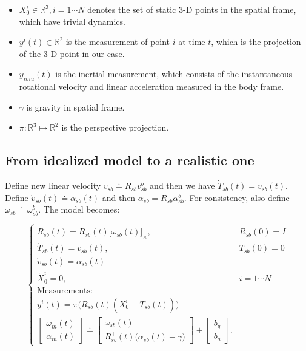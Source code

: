 \documentclass[letter,10pt]{article}
\newcommand{\real}{\mathbb{R}}
\newcommand{\asym}[1]{{\lbrack #1\rbrack}_\times{}}
\begin{document}
\begin{itemize}
\item
$X_0^i \in \real^3, i=1\cdots N$ denotes the set of static 3-D points in the spatial frame, which have trivial dynamics.

\item
$y^i(t) \in \real^2$ is the measurement of point $i$ at time $t$, which is the projection of the 3-D point in our case.

\item
$y_{imu}(t)$ is the inertial measurement, which consists of the instantaneous rotational velocity and linear acceleration measured in the body frame.

\item
$\gamma$ is gravity in spatial frame.

\item
$\pi: \real^3 \mapsto \real^2$ is the perspective projection.

\end{itemize}

\subsection{From idealized model to a realistic one}
Define new linear velocity $v_{sb}\doteq R_{sb}v_{sb}^b$ and then we have $\dot{T}_{sb}(t)=v_{sb}(t)$. Define $\dot{v}_{sb}(t)\doteq \alpha_{sb}(t)$ and then $\alpha_{sb}=R_{sb}\alpha_{sb}^b$. For consistency, also define $\omega_{sb}\doteq \omega_{sb}^b$. The model becomes:

\begin{equation*}
\begin{cases}
\dot{R}_{sb}(t)=R_{sb}(t)\asym{\omega_{sb}(t)}, &R_{sb}(0)=I\\
\dot{T}_{sb}(t)=v_{sb}(t), &T_{sb}(0)=0\\
\dot{v}_{sb}(t)=\alpha_{sb}(t)\\
\dot{X}_0^i=0, &i=1\cdots N\\
\text{Measurements:}\\
y^i(t)=\pi\big(R_{sb}^\top(t)(X_0^i-T_{sb}(t))\big)\\
\begin{bmatrix}
 \omega_m(t)\\
 \alpha_m(t)
\end{bmatrix}
\doteq
\begin{bmatrix}
	    \omega_{sb}(t)\\
	    R_{sb}^\top(t) \big(\alpha_{sb}(t)-\gamma \big)
           \end{bmatrix}
+           
           \begin{bmatrix}
           b_g\\
           b_a
           \end{bmatrix}.
\end{cases}
\end{equation*}
\end{document}
